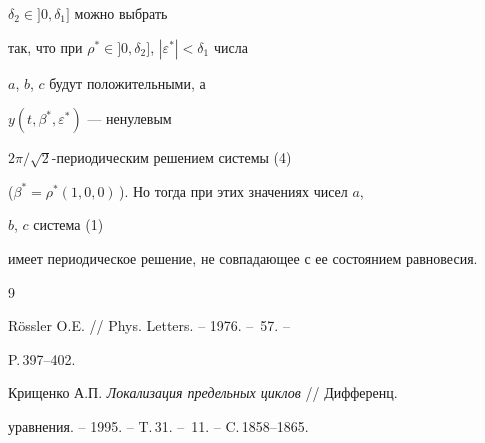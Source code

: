 $\delta_2\in]0,\delta_1]$ можно выбрать 


так, что при $\rho^*\in]0,\delta_2]$, $|\varepsilon^*|<\delta_1$ числа 


$a$, $b$, $c$ будут положительными, а 


$y(t,\beta^*,\varepsilon^*)$ --- ненулевым 


$2\pi/\sqrt{2}$-периодическим решением системы (4) 


($\beta^*=\rho^*(1,0,0)$\,). Но тогда при этих значениях чисел $a$, 


$b$, $c$ система (1) 


имеет периодическое решение, не совпадающее с ее состоянием равновесия. 


 


\begin{thebibliography}{9} 


 




R\"o{}ssler O.E. // Phys. Letters. -- 1976. -- \No\,57. -- 


P.\,397--402. 




Крищенко А.П. {\em Локализация предельных циклов} // Дифференц. 


уравнения. -- 1995. -- T.\,31. -- \No\,11. -- C.\,1858--1865. 


 


\end{thebibliography} 


 


\vskip 2cm 


 








\label{end} 


 


